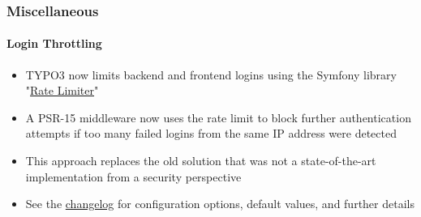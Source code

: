 %

\begin{frame}[fragile]
	\frametitle{Miscellaneous}
	\framesubtitle{Login Throttling}

	\begin{itemize}
		\item TYPO3 now limits backend and frontend logins using the Symfony library
			"\href{https://symfony.com/doc/current/rate_limiter.html}{Rate Limiter}"
		\item A PSR-15 middleware now uses the rate limit to block further authentication
			attempts if too many failed logins from the same IP address were detected
		\item This approach replaces the old solution that was not a state-of-the-art
			implementation from a security perspective
		\item See the
			\href{https://docs.typo3.org/c/typo3/cms-core/master/en-us/Changelog/11.3/Feature-93825-IntroduceRateLimiterComponent.html}{changelog}
			for configuration options, default values, and further details
	\end{itemize}
\end{frame}

